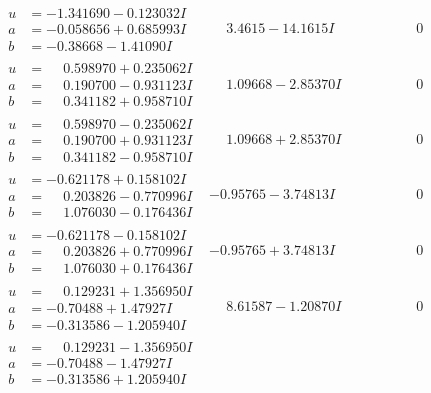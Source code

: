 \documentclass[1p]{elsarticle_modified}
\theoremstyle{definition}
\begin{document}
$$\begin{array}{c|c|c}
\begin{aligned}
u &= -1.341690 - 0.123032 I \\
a &= -0.058656 + 0.685993 I \\
b &= -0.38668 - 1.41090 I\end{aligned}
 & \phantom{-}3.4615 - 14.1615 I & \phantom{-0.000000 } 0 \\ \hline\begin{aligned}
u &= \phantom{-}0.598970 + 0.235062 I \\
a &= \phantom{-}0.190700 - 0.931123 I \\
b &= \phantom{-}0.341182 + 0.958710 I\end{aligned}
 & \phantom{-}1.09668 - 2.85370 I & \phantom{-0.000000 } 0 \\ \hline\begin{aligned}
u &= \phantom{-}0.598970 - 0.235062 I \\
a &= \phantom{-}0.190700 + 0.931123 I \\
b &= \phantom{-}0.341182 - 0.958710 I\end{aligned}
 & \phantom{-}1.09668 + 2.85370 I & \phantom{-0.000000 } 0 \\ \hline\begin{aligned}
u &= -0.621178 + 0.158102 I \\
a &= \phantom{-}0.203826 - 0.770996 I \\
b &= \phantom{-}1.076030 - 0.176436 I\end{aligned}
 & -0.95765 - 3.74813 I & \phantom{-0.000000 } 0 \\ \hline\begin{aligned}
u &= -0.621178 - 0.158102 I \\
a &= \phantom{-}0.203826 + 0.770996 I \\
b &= \phantom{-}1.076030 + 0.176436 I\end{aligned}
 & -0.95765 + 3.74813 I & \phantom{-0.000000 } 0 \\ \hline\begin{aligned}
u &= \phantom{-}0.129231 + 1.356950 I \\
a &= -0.70488 + 1.47927 I \\
b &= -0.313586 - 1.205940 I\end{aligned}
 & \phantom{-}8.61587 - 1.20870 I & \phantom{-0.000000 } 0 \\ \hline\begin{aligned}
u &= \phantom{-}0.129231 - 1.356950 I \\
a &= -0.70488 - 1.47927 I \\
b &= -0.313586 + 1.205940 I\end{aligned}

\end{array}$$
\end{document}
